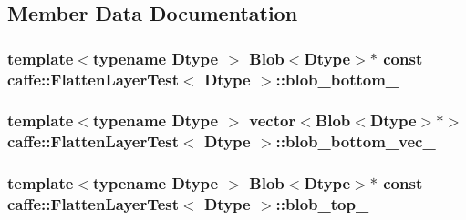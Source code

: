 \subsection{Member Data Documentation}
\hypertarget{classcaffe_1_1_flatten_layer_test_ac553bdfc0fcbf8c9e2c5f46f81a8bdca}{
\subsubsection[{blob\+\_\+bottom\+\_\+}]{\setlength{\rightskip}{0pt plus 5cm}template$<$typename Dtype $>$ {\bf Blob}$<$Dtype$>$$\ast$ const {\bf caffe\+::\+Flatten\+Layer\+Test}$<$ Dtype $>$\+::blob\+\_\+bottom\+\_\+\hspace{0.3cm}{\ttfamily [protected]}}}\label{classcaffe_1_1_flatten_layer_test_ac553bdfc0fcbf8c9e2c5f46f81a8bdca}
\hypertarget{classcaffe_1_1_flatten_layer_test_a65edcf7c3a3a0dc8cb5058dc2514a7fb}{
\subsubsection[{blob\+\_\+bottom\+\_\+vec\+\_\+}]{\setlength{\rightskip}{0pt plus 5cm}template$<$typename Dtype $>$ vector$<${\bf Blob}$<$Dtype$>$$\ast$$>$ {\bf caffe\+::\+Flatten\+Layer\+Test}$<$ Dtype $>$\+::blob\+\_\+bottom\+\_\+vec\+\_\+\hspace{0.3cm}{\ttfamily [protected]}}}\label{classcaffe_1_1_flatten_layer_test_a65edcf7c3a3a0dc8cb5058dc2514a7fb}
\hypertarget{classcaffe_1_1_flatten_layer_test_ab9f5b6129a7e55a87a5fea1f42deb1b4}{
\subsubsection[{blob\+\_\+top\+\_\+}]{\setlength{\rightskip}{0pt plus 5cm}template$<$typename Dtype $>$ {\bf Blob}$<$Dtype$>$$\ast$ const {\bf caffe\+::\+Flatten\+Layer\+Test}$<$ Dtype $>$\+::blob\+\_\+top\+\_\+\hspace{0.3cm}{\ttfamily [protected]}}}\label{classcaffe_1_1_flatten_layer_test_ab9f5b6129a7e55a87a5fea1f42deb1b4}
